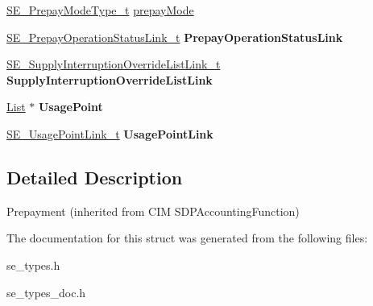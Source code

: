 \begin{DoxyCompactItemize}
\item 
\hyperlink{group__PrepayModeType_gad5775ab7dde98ccb92880e85b9a905b7}{S\+E\+\_\+\+Prepay\+Mode\+Type\+\_\+t} \hyperlink{group__Prepayment_gaa405ffaa7f1ebe0ebdaf55b747dcf629}{prepay\+Mode}
\item 
\hyperlink{structSE__PrepayOperationStatusLink__t}{S\+E\+\_\+\+Prepay\+Operation\+Status\+Link\+\_\+t} {\bfseries Prepay\+Operation\+Status\+Link}
\item 
\hyperlink{structSE__SupplyInterruptionOverrideListLink__t}{S\+E\+\_\+\+Supply\+Interruption\+Override\+List\+Link\+\_\+t} {\bfseries Supply\+Interruption\+Override\+List\+Link}
\item 
\hyperlink{structList}{List} $\ast$ {\bfseries Usage\+Point}
\item 
\hyperlink{structSE__UsagePointLink__t}{S\+E\+\_\+\+Usage\+Point\+Link\+\_\+t} {\bfseries Usage\+Point\+Link}
\end{DoxyCompactItemize}


\subsection{Detailed Description}
Prepayment (inherited from C\+IM S\+D\+P\+Accounting\+Function) 

The documentation for this struct was generated from the following files\+:\begin{DoxyCompactItemize}
\item 
se\+\_\+types.\+h\item 
se\+\_\+types\+\_\+doc.\+h\end{DoxyCompactItemize}
